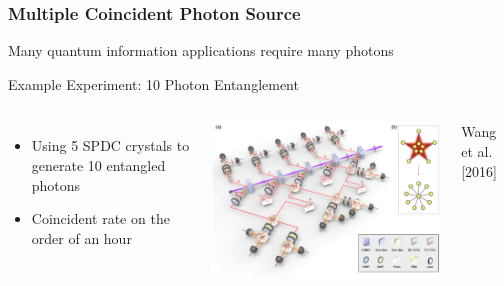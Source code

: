 \documentclass{beamer}
\begin{document}
\begin{frame}\frametitle{Multiple Coincident Photon Source}
    Many quantum information applications require many photons
    \begin{block}{Example Experiment: 10 Photon Entanglement}
        \begin{columns}
            \begin{itemize}
                \item Using 5 SPDC crystals to generate 10 entangled photons
                \item Coincident rate on the order of an hour
            \end{itemize}
            \centering
            \includegraphics[width=1.0\textwidth]{Images/10Photon.png}

            \tiny{Wang et al. [2016]}
        \end{columns}
    \end{block}
\end{frame}
\end{document}
